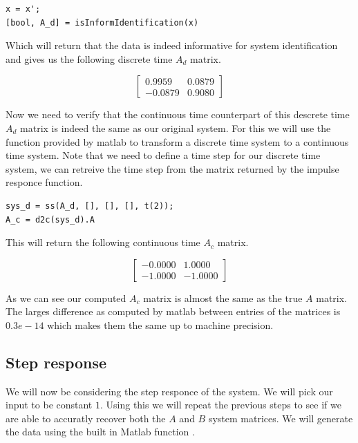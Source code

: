\begin{lstlisting}
x = x';
[bool, A_d] = isInformIdentification(x)
\end{lstlisting}

Which will return that the data is indeed informative for system identification and gives us the following discrete time $A_d$ matrix.

\begin{equation*}
	\begin{bmatrix}
		 0.9959 &   0.0879 \\
		-0.0879 &   0.9080
	\end{bmatrix}
\end{equation*}

Now we need to verify that the continuous time counterpart of this descrete time $A_d$ matrix is indeed the same as our original system. For this we will use the function  provided by matlab to transform a discrete time system to a continuous time system. Note that we need to define a time step for our discrete time system, we can retreive the time step from the  matrix returned by the impulse responce function.

\begin{lstlisting}
sys_d = ss(A_d, [], [], [], t(2));
A_c = d2c(sys_d).A
\end{lstlisting}

This will return the following continuous time $A_c$ matrix.

\begin{equation*}
	\begin{bmatrix}
		-0.0000 &   1.0000\\
		-1.0000 &  -1.0000
	\end{bmatrix}
\end{equation*}

As we can see our computed $A_c$ matrix is almost the same as the true $A$ matrix. The larges difference as computed by matlab between entries of the matrices is $0.3e-14$ which makes them the same up to machine precision.

\subsection{Step response}
We will now be considering the step responce of the system. We will pick our input to be constant $1$. Using this we will repeat the previous steps to see if we are able to accuratly recover both the $A$ and $B$ system matrices. We will generate the data using the built in Matlab function . 

